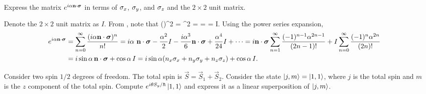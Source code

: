 \begin{problem} \label{2.2}
	Express the matrix $e^{i \alpha \mathbf{n} \cdot \boldsymbol{\sigma}}$ in terms of $\sigma_x$, $\sigma_y$, and $\sigma_z$ and the $2 \times 2$ unit matrix.
\end{problem}

\begin{solution}
	Denote the $2 \times 2$ unit matrix as $I$.  From , note that
	\beqn \label{paulisq}
		(\nds)^2 = \mqty[ \nz & \nx - i \ny \\ \nx + i \ny & -\nz ]^2
		= \mqty[ \nx^2 + \ny^2 + \nz^2 & (\nz - \nz) (\nx - i \ny) \\
				(\nz - \nz) (\nx + i \ny) & \nx^2 + \ny^2 + \nz^2]
		= \mqty[ 1 & 0 \\ 0 & 1 ]
		= I.
	\eeqn
	Using the power series expansion,
	\begin{align}
		e^{i \alpha \mathbf{n} \cdot \boldsymbol{\sigma}} &= \sum_{n = 0}^\infty \frac{(i \alpha \mathbf{n} \cdot \boldsymbol{\sigma})^n}{n!}
		= i \alpha \ \mathbf{n} \cdot \boldsymbol{\sigma} - \frac{\alpha^2}{2} I - \frac{i \alpha^3}{6} \mathbf{n} \cdot \boldsymbol{\sigma} + \frac{\alpha^4}{24} I + \cdots
		= i \mathbf{n} \cdot \boldsymbol{\sigma} \sum_{n = 1}^\infty \frac{(-1)^{n-1} \alpha^{2n - 1}}{(2n - 1)!} + I \sum_{n = 0}^\infty \frac{(-1)^n \alpha^{2n}}{(2n)!} \notag \\
		&= i \sin{\alpha} \, \mathbf{n} \cdot \boldsymbol{\sigma} + \cos{\alpha} \, I = i \sin{\alpha} (n_x \sigma_x + n_y \sigma_y + n_z \sigma_z) + \cos{\alpha} \, I. \label{eiands}
	\end{align}
\vfix
\end{solution}

\newcommand{\Sy}{S_y}
\newcommand{\Sz}{S_z}
\newcommand{\vS}{\vec{S}}
\newcommand{\vSq}{\vS_1}
\newcommand{\vSw}{\vS_2}
\newcommand{\eitsyh}{e^{i \tht \Sy / \hbar}}

\newcommand{\kjm}{\ket{j, m}}
\newcommand{\kqq}{\ket{1, 1}}
\newcommand{\koo}{\ket{0, 0}}
\newcommand{\kqo}{\ket{1, 0}}
\newcommand{\kqnq}{\ket{1, -1}}

\newcommand{\Syq}{{\Sy}_1}
\newcommand{\Syw}{{\Sy}_2}
\newcommand{\sz}{s_z}
\newcommand{\ksz}{\ket{\sz}}
\newcommand{\szq}{{\sz}_1}
\newcommand{\szw}{{\sz}_2}
\newcommand{\kszsz}{\ket{\szq \, \szw}}

\newcommand{\up}{\uparrow}
\newcommand{\dn}{\downarrow}
\newcommand{\kuu}{\ket{\up \up}}
\newcommand{\kdd}{\ket{\dn \dn}}
\newcommand{\kud}{\ket{\up \dn}}
\newcommand{\kdu}{\ket{\dn \up}}

\begin{problem}
	Consider two spin $1/2$ degrees of freedom.  The total spin is $\vS = \vSq + \vSw$.  Consider the state $\kjm = \kqq$, where $j$ is the total spin and $m$ is the $z$ component of the total spin.  Compute $\eitsyh \kqq$ and express it as a linear superposition of $\kjm$.
\end{problem}

